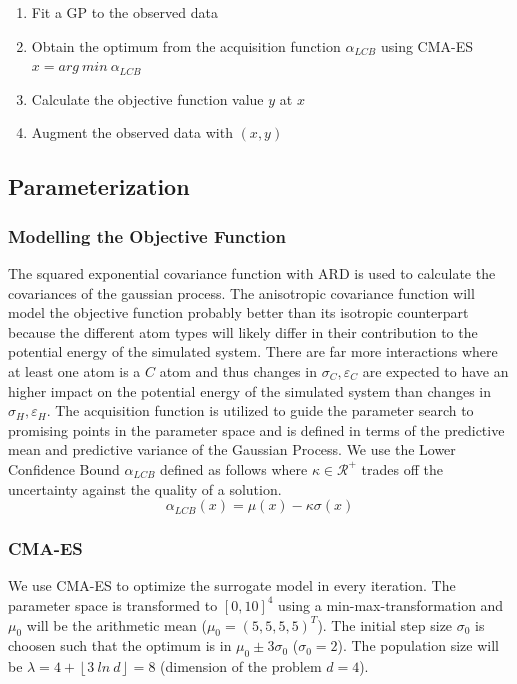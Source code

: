 \documentclass[preprint,12pt]{elsarticle}
\begin{document}
\begin{enumerate}
    \item Fit a GP to the observed data
    \item Obtain the optimum from the acquisition function $\alpha_{LCB}$ using CMA-ES $x = arg\ min\ \alpha_{LCB}$
    \item Calculate the objective function value $y$ at $x$
    \item Augment the observed data with $(x, y)$
\end{enumerate}

\subsection{Parameterization}
\subsubsection{Modelling the Objective Function}
The squared exponential covariance function with ARD is used to calculate the covariances of the gaussian process. The anisotropic covariance function will model the objective function probably better than its isotropic counterpart because the different atom types will likely differ in their contribution to the potential energy of the simulated system. There are far more interactions where at least one atom is a $C$ atom and thus changes in $\sigma_C, \varepsilon_C$ are expected to have an higher impact on the potential energy of the simulated system than changes in $\sigma_H, \varepsilon_H$.
The acquisition function is utilized to guide the parameter search to promising points in the parameter space and is defined in terms of the predictive mean and predictive variance of the Gaussian Process. We use the Lower Confidence Bound $\alpha_{LCB}$ defined as follows where $\kappa \in \mathcal{R}^+$ trades off the uncertainty against the quality of a solution.
\begin{equation}
    \alpha_{LCB}(x) = \mu(x) - \kappa\sigma(x)
\end{equation}

\subsubsection{CMA-ES}
We use CMA-ES to optimize the surrogate model in every iteration. The parameter space is transformed to $[0, 10]^4$ using a min-max-transformation and $\mu_0$ will be the arithmetic mean ($\mu_0 = (5,5,5,5)^T$). The initial step size $\sigma_0$ is choosen such that the optimum is in $\mu_0 \pm 3\sigma_0$ ($\sigma_0 = 2$). The population size will be $\lambda = 4 + \left \lfloor{3\ ln\ d}\right \rfloor = 8$ (dimension of the problem $d=4$).
\end{document}
